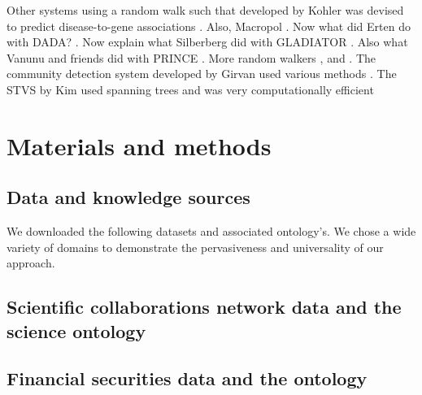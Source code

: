 \documentclass[a4paper,8pt,twocolumn,5p]{elsarticle}
\begin{document}
Other systems using a random walk such that developed by Kohler was devised to predict disease-to-gene associations \cite{Kohler2008}. Also, Macropol \cite{Macropol2009}. Now what did Erten do with DADA? \cite{Erten2011}. Now explain what Silberberg did with GLADIATOR \cite{Silberberg2017}. Also what Vanunu and friends did with PRINCE \cite{Vanunu2010}. More random walkers \cite{Li2018}, \cite{Cupertino2018} and \cite{Xin2016}.  The community detection system developed by Girvan used various methods \cite{Girvan2002}. The STVS by Kim used spanning trees and was very computationally efficient \cite{Kim2013}
 

\section{Materials and methods}
\subsection{Data and knowledge sources}
We downloaded the following datasets and associated ontology's. We chose a wide variety of domains to demonstrate the pervasiveness and universality of our approach.


\subsection{Scientific collaborations network data and the science ontology}

\subsection{Financial securities data and the  ontology}
\end{document}
